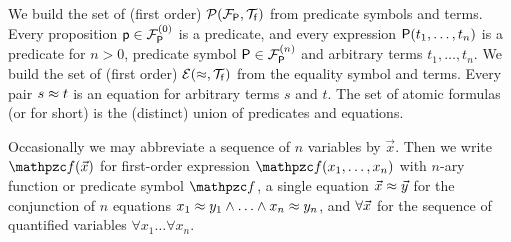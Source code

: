 
\begin{definition}\label{def:predicates}\label{def:equations}\label{def:atoms}
	We build the set of (first order)  \( \mcPT \)
	from predicate symbols and terms.
	Every proposition \( \mpp\in \mcFPn[0] \) is a predicate,
	and every expression \( \mP(t_1,\ldots,t_n) \) is a predicate for \( n>0 \),
	predicate symbol \( \mP\in\mcFPn \) and arbitrary terms \( t_1,\ldots,t_n \).
%
	We build the set of (first order) \( \mcET \) from the equality symbol and terms.
	Every pair \( s\mEQ t \) is an equation %
	for arbitrary terms \( s \) and \( t \).
%
	The set of atomic formulas (or  for short) is the (distinct) union of predicates and equations.
\end{definition}

\begin{definition}
	Occasionally we may abbreviate a sequence of \( n \) variables by \( \vec{x} \).
	Then we write \( \mcf(\vecn{x}) \)
	for first-order expression \( \mcf(x_1,\ldots,x_n) \)
	with \(n\)-ary function or predicate symbol \( \mcf \),
	a single equation \( \vecn{x}\mEQ\vecn{y} \) for
	the conjunction of \( n \) equations
	\( x_1\mEQ y_1\land\ldots\land x_n\mEQ y_n \),
	and \( \forall\vecn{x} \) for
	the sequence of quantified variables \( \forall x_1\ldots\forall x_n \).
\end{definition}